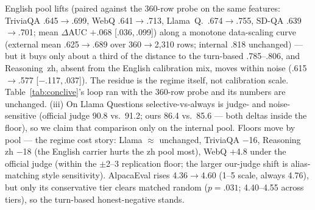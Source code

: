 English pool lifts (paired against the 360-row probe on the same
features: TriviaQA .645$\to$.699, WebQ .641$\to$.713, Llama~Q.\
.674$\to$.755, SD-QA .639$\to$.701; mean $\Delta$AUC $+$.068
[.036,\,.099]) along a monotone data-scaling curve (external mean
.625$\to$.689 over 360$\to$2{,}310 rows; internal .818 unchanged)
--- but it buys only about a third of the distance to the turn-based
.785--.806, and Reasoning~zh, absent from the English calibration
mix, moves within noise (.615$\to$.577 [$-$.117,\,.037]). The
residue is the regime itself, not calibration scale.
Table~\ref{tab:conclive}'s loop ran with the 360-row probe and its
numbers are unchanged. (iii) On Llama
Questions selective-vs-always is judge- and noise-sensitive (official
judge 90.8 vs.\ 91.2; ours 86.4 vs.\ 85.6 --- both deltas inside the
floor), so we claim that comparison only on the internal pool.
Floors move by pool --- the regime cost
story: Llama $\approx$ unchanged, TriviaQA $-$16, Reasoning zh $-$18
(the English carrier hurts the zh pool most), WebQ $+$4.8 under the
official judge (within the $\pm$2--3 replication floor; the larger
our-judge shift is alias-matching style sensitivity). AlpacaEval
rises 4.36$\to$4.60 (1--5 scale, always 4.76), but only its
conservative tier clears matched random ($p{=}.031$; 4.40--4.55
across tiers), so the turn-based honest-negative stands.

